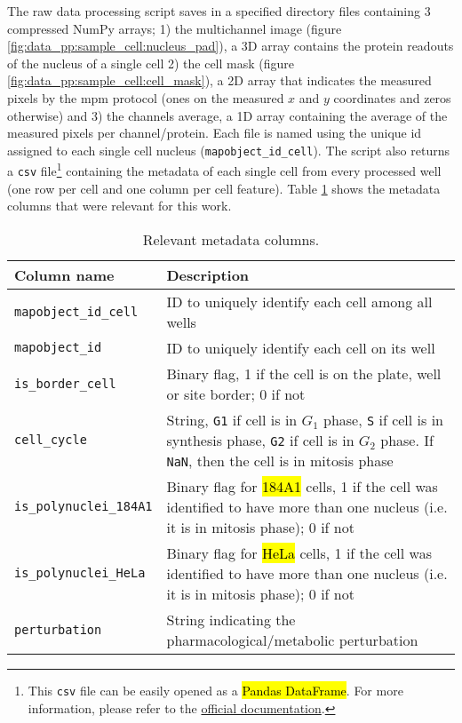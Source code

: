 The raw data processing script saves in a specified directory files containing 3 compressed NumPy arrays; 1) the multichannel image (figure \ref{fig:data_pp:sample_cell:nucleus_pad}), a 3D array contains the protein readouts of the nucleus of a single cell 2) the cell mask (figure \ref{fig:data_pp:sample_cell:cell_mask}), a 2D array that indicates the measured pixels by the \gls{mpm} protocol (ones on the measured $x$ and $y$ coordinates and zeros otherwise) and 3) the channels average, a 1D array containing the average of the measured pixels per channel/protein. Each file is named using the unique id assigned to each single cell nucleus (\texttt{mapobject\_id\_cell}).
The script also returns a \texttt{csv} file\footnote{This \texttt{csv} file can be easily opened as a \hl{Pandas DataFrame}. For more information, please refer to the \href{https://pandas.pydata.org/pandas-docs/stable/reference/api/pandas.DataFrame.html}{official documentation}.} containing the metadata of each single cell from every processed well (one row per cell and one column per cell feature). Table \ref{table:dataset:metadata} shows the metadata columns that were relevant for this work.

\setlength{\mylinewidth}{\linewidth-7pt}%
\setlength{\mylengtha}{0.3\mylinewidth-2\arraycolsep}%
\setlength{\mylengthb}{0.7\mylinewidth-2\arraycolsep}%

\begin{table}[!ht]
  \centering
  \begin{tabular}{>{\centering\arraybackslash}m{\mylengtha}|m{\mylengthb}} %
    \hline
    Column name & Description \\
    \hline
    \texttt{mapobject\_id\_cell} & ID to uniquely identify each cell among all wells \\
    \hline
    \texttt{mapobject\_id} & ID to uniquely identify each cell on its well \\
    \hline
    \texttt{is\_border\_cell} & Binary flag, 1 if the cell is on the plate, well or site border; 0 if not \\
    \hline
    \texttt{cell\_cycle} & String, \texttt{G1} if cell is in $G_1$ phase, \texttt{S} if cell is in synthesis phase, \texttt{G2} if cell is in $G_2$ phase. If \texttt{NaN}, then the cell is in mitosis phase \\
    \hline
    \texttt{is\_polynuclei\_184A1} & Binary flag for \hl{184A1} cells, 1 if the cell was identified to have more than one nucleus (i.e. it is in mitosis phase); 0 if not\\
    \hline
    \texttt{is\_polynuclei\_HeLa} & Binary flag for \hl{HeLa} cells, 1 if the cell was identified to have more than one nucleus (i.e. it is in mitosis phase); 0 if not\\
    \hline
    \texttt{perturbation} & String indicating the pharmacological/metabolic perturbation \\
    \hline
  \end{tabular}
  \caption{Relevant metadata columns.}
  \label{table:dataset:metadata}
\end{table}

